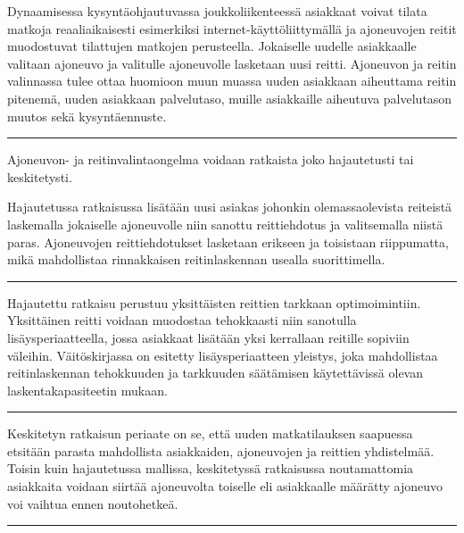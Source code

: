 \documentclass[a4paper,12pt]{article}
\newcommand*\sepline{%
  \begin{center}
    \rule[1ex]{.5\textwidth}{.5pt}
  \end{center}}
\begin{document}

Dynaamisessa kysyntäohjautuvassa joukkoliikenteessä asiakkaat voivat tilata matkoja reaaliaikaisesti esimerkiksi internet-käyttöliittymällä ja 
ajoneuvojen reitit muodostuvat tilattujen matkojen perusteella. Jokaiselle uudelle asiakkaalle valitaan ajoneuvo ja 
valitulle ajoneuvolle lasketaan uusi reitti. Ajoneuvon ja reitin valinnassa tulee ottaa huomioon muun muassa 
uuden asiakkaan aiheuttama reitin pitenemä, uuden asiakkaan palvelutaso, muille asiakkaille aiheutuva palvelutason muutos sekä kysyntäennuste.

\sepline

Ajoneuvon- ja reitinvalintaongelma voidaan ratkaista joko hajautetusti tai keskitetysti. 

Hajautetussa ratkaisussa lisätään uusi asiakas johonkin olemassaolevista reiteistä laskemalla jokaiselle 
ajoneuvolle niin sanottu reittiehdotus ja valitsemalla niistä paras. Ajoneuvojen reittiehdotukset lasketaan erikseen ja toisistaan riippumatta, 
mikä mahdollistaa rinnakkaisen reitinlaskennan usealla suorittimella. %

\sepline

Hajautettu ratkaisu perustuu yksittäisten reittien tarkkaan optimoimintiin. Yksittäinen reitti voidaan muodostaa
tehokkaasti niin sanotulla lisäysperiaatteella, jossa asiakkaat lisätään yksi kerrallaan reitille sopiviin väleihin. 
Väitöskirjassa on esitetty lisäysperiaatteen yleistys, joka mahdollistaa reitinlaskennan tehokkuuden ja tarkkuuden 
säätämisen käytettävissä olevan laskentakapasiteetin mukaan. 

\sepline

Keskitetyn ratkaisun periaate on se, että uuden matkatilauksen saapuessa etsitään parasta mahdollista asiakkaiden, 
ajoneuvojen ja reittien yhdistelmää. Toisin kuin hajautetussa mallissa, keskitetyssä ratkaisussa noutamattomia asiakkaita voidaan siirtää
ajoneuvolta toiselle eli asiakkaalle määrätty ajoneuvo voi vaihtua ennen noutohetkeä. 

\sepline
\end{document}
